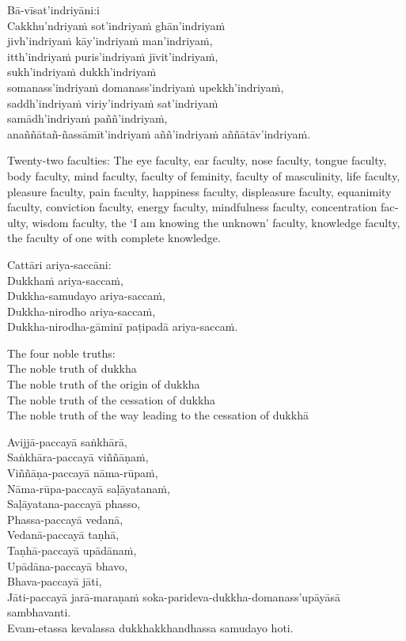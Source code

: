 \suttaRef{[MN 115]}

Bā-vīsat’indriyāni:i\\
Cakkhu’ndriyaṁ sot’indriyaṁ ghān’indriyaṁ\\
jivh’indriyaṁ kāy’indriyaṁ man’indriyaṁ,\\
itth’indriyaṁ puris’indriyaṁ jīvit’indriyaṁ,\\
sukh’indriyaṁ dukkh’indriyaṁ\\
somanass’indriyaṁ domanass’indriyaṁ upekkh’indriyaṁ,\\
saddh’indriyaṁ viriy’indriyaṁ sat’indriyaṁ\\
samādh’indriyaṁ paññ’indriyaṁ,\\
anaññātañ-ñassāmīt’indriyaṁ aññ’indriyaṁ aññātāv’indriyaṁ.

\begin{english}
  Twenty-two faculties: The eye faculty, ear faculty, nose faculty, tongue faculty, body faculty, mind faculty, faculty of feminity, faculty of masculinity, life faculty, pleasure faculty, pain faculty, happiness faculty, displeasure faculty, equanimity faculty, conviction faculty, energy faculty, mindfulness faculty, concentration faculty, wisdom faculty, the ‘I am knowing the unknown’ faculty, knowledge faculty, the faculty of one with complete knowledge.
\end{english}

\suttaRef{[Vibh]}

Cattāri ariya-saccāni:\\
Dukkhaṁ ariya-saccaṁ,\\
Dukkha-samudayo ariya-saccaṁ,\\
Dukkha-nirodho ariya-saccaṁ,\\
Dukkha-nirodha-gāminī paṭipadā ariya-saccaṁ.

\begin{english}
  The four noble truths:\\
  The noble truth of dukkha\\
  The noble truth of the origin of dukkha\\
  The noble truth of the cessation of dukkha\\
  The noble truth of the way leading to the cessation of dukkhā
\end{english}

\suttaRef{[SN 56.24]}

Avijjā-paccayā saṅkhārā,\\
Saṅkhāra-paccayā viññāṇaṁ,\\
Viññāṇa-paccayā nāma-rūpaṁ,\\
Nāma-rūpa-paccayā saḷāyatanaṁ,\\
Saḷāyatana-paccayā phasso,\\
Phassa-paccayā vedanā,\\
Vedanā-paccayā taṇhā,\\
Taṇhā-paccayā upādānaṁ,\\
Upādāna-paccayā bhavo,\\
Bhava-paccayā jāti,\\
Jāti-paccayā jarā-maraṇaṁ soka-parideva-dukkha-domanass’upāyāsā sambhavanti.\\
Evam-etassa kevalassa dukkhakkhandhassa samudayo hoti.

